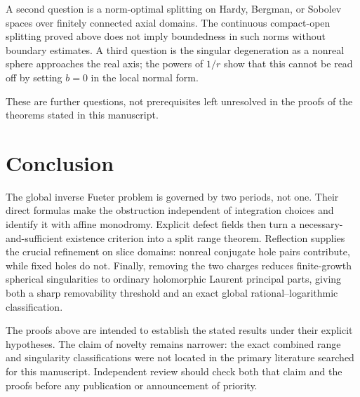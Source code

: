 \documentclass[11pt,a4paper]{article}
\numberwithin{equation}{section}
\theoremstyle{definition}
\theoremstyle{remark}
\begin{document}
A second question is a norm-optimal splitting on Hardy, Bergman, or
Sobolev spaces over finitely connected axial domains. The continuous
compact-open splitting proved above does not imply boundedness in
such norms without boundary estimates. A third question is the
singular degeneration as a nonreal sphere approaches the real axis;
the powers of $1/r$ show that this cannot be read off by setting
$b=0$ in the local normal form.

These are further questions, not prerequisites left unresolved in the
proofs of the theorems stated in this manuscript.

\section{Conclusion}
The global inverse Fueter problem is governed by two periods, not one.
Their direct formulas make the obstruction independent of integration
choices and identify it with affine monodromy. Explicit defect fields
then turn a necessary-and-sufficient existence criterion into a split
range theorem. Reflection supplies the crucial refinement on slice
domains: nonreal conjugate hole pairs contribute, while fixed holes do
not. Finally, removing the two charges reduces finite-growth spherical
singularities to ordinary holomorphic Laurent principal parts, giving
both a sharp removability threshold and an exact global
rational--logarithmic classification.

The proofs above are intended to establish the stated results under
their explicit hypotheses. The claim of novelty remains narrower: the exact combined range
and singularity classifications were not located in the primary
literature searched for this manuscript. Independent review should
check both that claim and the proofs before any publication or
announcement of priority.
\end{document}

